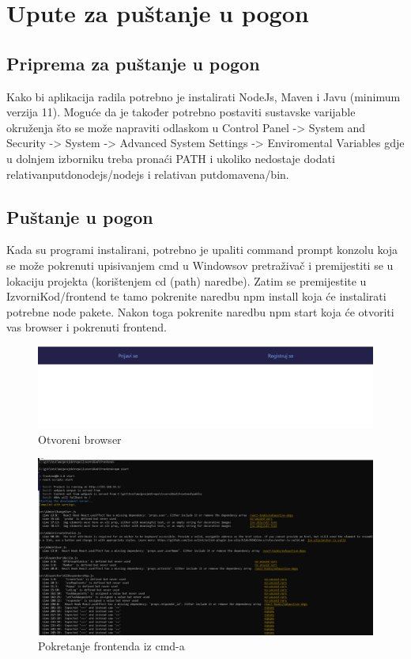 			\eject 
		
		\section{Upute za puštanje u pogon}
		
			\subsection{Priprema za puštanje u pogon}
			
			Kako bi aplikacija radila potrebno je instalirati NodeJs, Maven i Javu (minimum verzija 11). Moguće da je također potrebno postaviti sustavske varijable okruženja što se može napraviti  odlaskom u Control Panel -> System and Security -> System -> Advanced System Settings -> Enviromental Variables gdje u dolnjem izborniku treba pronaći PATH i ukoliko nedostaje dodati relativanputdonodejs/nodejs i relativan putdomavena/bin.
			
			\subsection{Puštanje u pogon}
			
			Kada su programi instalirani, potrebno je upaliti command prompt konzolu koja se može pokrenuti upisivanjem cmd u Windowsov pretraživač i premijestiti se u lokaciju projekta (korištenjem cd (path) naredbe). Zatim se premijestite u IzvorniKod/frontend te tamo pokrenite naredbu npm install koja će instalirati potrebne node pakete. Nakon toga pokrenite naredbu npm start koja će otvoriti vas browser i pokrenuti frontend.
			

		
				\begin{figure}[H]
					\includegraphics[scale=0.3]{slike/browser.png}
					\centering
					\caption{Otvoreni browser}
					\label{fig:test4}
				\end{figure}
		
				\begin{figure}[H]
					\includegraphics[scale=0.3]{slike/pokretanje_frontenda.png}
					\centering
					\caption{Pokretanje frontenda iz cmd-a}
					\label{fig:test3}
				\end{figure}
			
